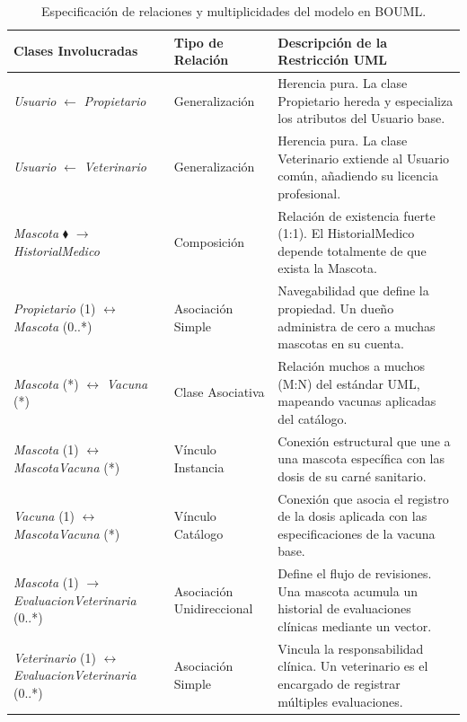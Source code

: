 \documentclass[journal,onecolumn]{IEEEtran}
\begin{document}
	\begin{table}[H]
		\caption{Especificación de relaciones y multiplicidades del modelo en BOUML.}
		\label{tab:clases_bouml}
		\centering
		\renewcommand{\arraystretch}{1.1}
		\begin{tabular}{|p{3.8cm}|p{2.6cm}|p{8.2cm}|}
			\hline
			\textbf{Clases Involucradas} & \textbf{Tipo de Relación} & \textbf{Descripción de la Restricción UML} \\
			\hline
			\textit{Usuario} $\leftarrow$ \textit{Propietario} & Generalización & Herencia pura. La clase Propietario hereda y especializa los atributos del Usuario base. \\ \hline
			\textit{Usuario} $\leftarrow$ \textit{Veterinario} & Generalización & Herencia pura. La clase Veterinario extiende al Usuario común, añadiendo su licencia profesional. \\ \hline
			\textit{Mascota} $\blacklozenge$ $\rightarrow$ \textit{HistorialMedico} & Composición & Relación de existencia fuerte (1:1). El HistorialMedico depende totalmente de que exista la Mascota. \\ \hline
			\textit{Propietario} (1) $\leftrightarrow$ \textit{Mascota} (0..*) & Asociación Simple & Navegabilidad que define la propiedad. Un dueño administra de cero a muchas mascotas en su cuenta. \\ \hline
			\textit{Mascota} (*) $\leftrightarrow$ \textit{Vacuna} (*) & Clase Asociativa & Relación muchos a muchos (M:N) del estándar UML, mapeando vacunas aplicadas del catálogo. \\ \hline
			\textit{Mascota} (1) $\leftrightarrow$ \textit{MascotaVacuna} (*) & Vínculo Instancia & Conexión estructural que une a una mascota específica con las dosis de su carné sanitario. \\ \hline
			\textit{Vacuna} (1) $\leftrightarrow$ \textit{MascotaVacuna} (*) & Vínculo Catálogo & Conexión que asocia el registro de la dosis aplicada con las especificaciones de la vacuna base. \\ \hline
			\textit{Mascota} (1) $\rightarrow$ \textit{EvaluacionVeterinaria} (0..*) & Asociación Unidireccional & Define el flujo de revisiones. Una mascota acumula un historial de evaluaciones clínicas mediante un vector. \\ \hline
			\textit{Veterinario} (1) $\leftrightarrow$ \textit{EvaluacionVeterinaria} (0..*) & Asociación Simple & Vincula la responsabilidad clínica. Un veterinario es el encargado de registrar múltiples evaluaciones. \\
			\hline
		\end{tabular}
	\end{table}
	
\end{document}
